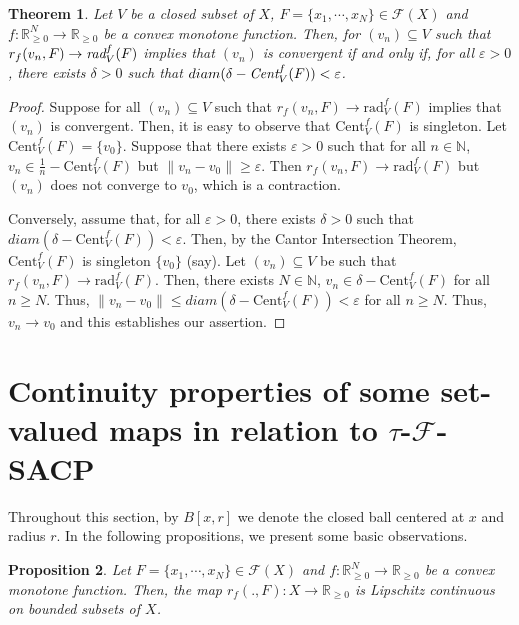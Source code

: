 \documentclass[11pt]{amsart}
\newtheorem{thm}{Theorem}[section]
\newtheorem{prop}[thm]{Proposition}
\newcommand{\ra}{\rightarrow}
\newcommand{\ci}{\subseteq}
\newcommand{\de}{\delta}
\newcommand{\e}{\varepsilon}
\newcommand{\mb}{\mathbb}
\newcommand{\mc}{\mathcal}
\newcommand{\mr}{\mathscr}
\newcommand{\trC}{\textrm{Cent}}
\newcommand{\trr}{\textrm{rad}}
\newcommand{\emC}{\emph{Cent}}
\newcommand{\emr}{\emph{rad}}
\begin{document}
\begin{thm}
Let $V$ be a closed subset of $X$, $F=\{x_1,\cdots,x_N\}\in \mc{F}(X)$ and $f:\mb{R}^N_{\geq0}\ra\mb{R}_{\geq0}$ be a convex monotone function. Then, for $(v_n)\ci V$ such that $r_f(v_n,F)\ra\emr_V^f(F)$ implies that $(v_n)$ is convergent if and only if, for all $\e>0$, there exists $\de>0$ such that $diam(\de-\emC_V^f(F))<\e$.
\end{thm}
\begin{proof}
 Suppose for all $(v_n)\ci V$ such that $r_f(v_n,F)\ra\trr_V^f(F)$ implies that $(v_n)$ is convergent. Then, it is easy to observe that $\trC_V^f(F)$ is singleton. Let $\trC_V^f(F)=\{v_0\}$. Suppose that there exists $\e>0$ such that for all $n\in\mb{N}$, $v_n\in\frac{1}{n}-\trC_V^f(F)$ but $\|v_n-v_0\|\geq\e$. Then $r_f(v_n,F)\ra\trr_V^f(F)$ but $(v_n)$ does not converge to $v_0$, which is a contraction. 

 Conversely, assume that, for all $\e>0$, there exists $\de>0$ such that $diam(\de-\trC_V^f(F))<\e$. Then, by the Cantor Intersection Theorem, $\trC_V^f(F)$ is singleton $\{v_0\}$ (say). Let $(v_n)\ci V$ be such that $r_f(v_n,F)\ra\trr_V^f(F)$. Then, there exists $N\in\mb{N}$, $v_n\in\de-\trC_V^f(F)$ for all $n\geq N$. Thus, $\|v_n-v_0\|\leq diam(\de-\trC_V^f(F))<\e$ for all $n\geq N$. Thus, $v_n\ra v_0$ and this establishes our assertion.
\end{proof}
\section{Continuity properties of some set-valued maps in relation to $\tau$-$\mr{F}$-SACP}
Throughout this section, by $B[x,r]$ we denote the closed ball centered at $x$ and radius $r$. In the following propositions, we present some basic observations.
\begin{prop}\label{P4}
Let $F=\{x_1,\cdots,x_N\}\in\mc{F}(X)$ and $f:\mb{R}^N_{\geq0}\ra\mb{R}_{\geq0}$ be a convex monotone function. Then, the map $r_f(.,F):X\ra\mb{R}_{\geq0}$ is Lipschitz continuous on bounded subsets of $X$.
\end{prop}
\end{document}

